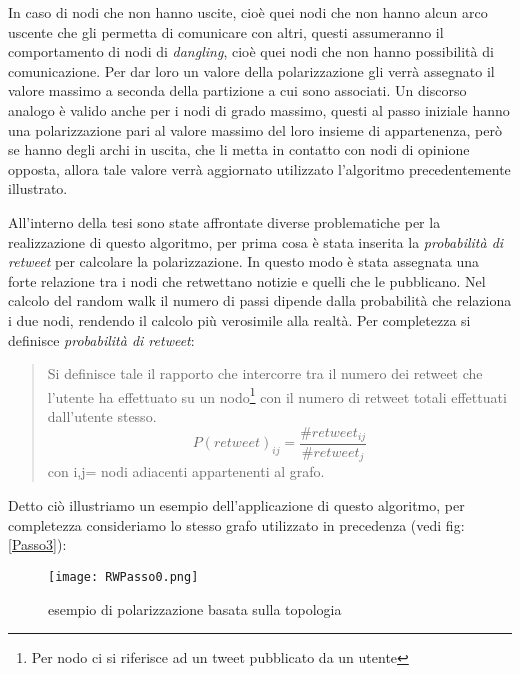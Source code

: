 In caso di nodi che non hanno uscite, cioè quei nodi che non hanno alcun arco uscente che gli permetta di comunicare con altri, questi assumeranno il comportamento di nodi di \textit{dangling}, cioè quei nodi che non hanno possibilità di comunicazione. Per dar loro un valore della polarizzazione gli verrà assegnato il valore massimo a seconda della partizione a cui sono associati.
Un discorso analogo è valido anche per i nodi di grado massimo, questi al passo iniziale hanno una polarizzazione pari al valore massimo del loro insieme di appartenenza, però se hanno degli archi in uscita, che li metta in contatto con nodi di opinione opposta, allora tale valore verrà aggiornato utilizzato l'algoritmo precedentemente illustrato.


All'interno della tesi sono state affrontate diverse problematiche per la realizzazione di questo algoritmo, per prima cosa è stata inserita la \textit{probabilità di retweet} per calcolare la polarizzazione. In questo modo è stata assegnata una forte relazione tra i nodi che retwettano notizie e quelli che le pubblicano. Nel calcolo del random walk il numero di passi dipende dalla probabilità che relaziona i due nodi, rendendo il calcolo più verosimile alla realtà.
Per completezza si definisce \textit{probabilità di retweet}:
\begin{quote}
Si definisce tale il rapporto che intercorre tra il numero dei retweet che l'utente ha effettuato su un nodo\footnote{Per nodo ci si riferisce ad un tweet pubblicato da un utente} con il numero di retweet totali effettuati dall'utente stesso.
\begin{equation}
 P(retweet)_{ij} = \dfrac{\#retweet_{ij}}{\#retweet_{j}} 
\end{equation}
 con i,j= nodi adiacenti appartenenti al grafo.
 \end{quote}

Detto ciò illustriamo un esempio dell'applicazione di questo algoritmo, per completezza consideriamo lo stesso grafo utilizzato in precedenza (vedi fig:\ref{Passo3}):
\begin{figure}[htbp]
    \begin{center}
      \texttt{[image: RWPasso0.png]}
		\caption{esempio di polarizzazione basata sulla topologia}
	\label{RandomWalk}
    \end{center}
  \end{figure}

